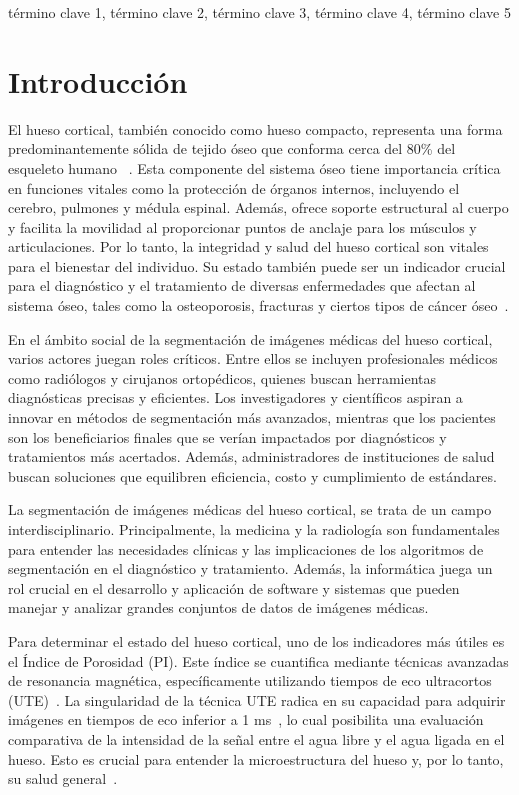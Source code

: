 \documentclass[conference]{IEEEtran}
\begin{document}
\begin{IEEEkeywords}
término clave 1, término clave 2, término clave 3, término clave 4, término clave 5
\end{IEEEkeywords}

\section{Introducción}

\noindent El hueso cortical, también conocido como hueso compacto, representa una forma predominantemente sólida de tejido óseo que conforma cerca del 80\% del esqueleto humano ~\cite{nyman2008measurements}. Esta componente del sistema óseo tiene importancia crítica en funciones vitales como la protección de órganos internos, incluyendo el cerebro, pulmones y médula espinal. Además, ofrece soporte estructural al cuerpo y facilita la movilidad al proporcionar puntos de anclaje para los músculos y articulaciones. Por lo tanto, la integridad y salud del hueso cortical son vitales para el bienestar del individuo. Su estado también puede ser un indicador crucial para el diagnóstico y el tratamiento de diversas enfermedades que afectan al sistema óseo, tales como la osteoporosis, fracturas y ciertos tipos de cáncer óseo~\cite{nyman2008measurements}.

\noindent En el ámbito social de la segmentación de imágenes médicas del hueso cortical, varios actores juegan roles críticos. Entre ellos se incluyen profesionales médicos como radiólogos y cirujanos ortopédicos, quienes buscan herramientas diagnósticas precisas y eficientes. Los investigadores y científicos aspiran a innovar en métodos de segmentación más avanzados, mientras que los pacientes son los beneficiarios finales que se verían impactados por diagnósticos y tratamientos más acertados. Además, administradores de instituciones de salud buscan soluciones que equilibren eficiencia, costo y cumplimiento de estándares.

\noindent La segmentación de imágenes médicas del hueso cortical, se trata de un campo interdisciplinario. Principalmente, la medicina y la radiología son fundamentales para entender las necesidades clínicas y las implicaciones de los algoritmos de segmentación en el diagnóstico y tratamiento. Además, la informática juega un rol crucial en el desarrollo y aplicación de software y sistemas que pueden manejar y analizar grandes conjuntos de datos de imágenes médicas.

\noindent Para determinar el estado del hueso cortical, uno de los indicadores más útiles es el Índice de Porosidad (PI). Este índice se cuantifica mediante técnicas avanzadas de resonancia magnética, específicamente utilizando tiempos de eco ultracortos (UTE)~\cite{Jerban2023}. La singularidad de la técnica UTE radica en su capacidad para adquirir imágenes en tiempos de eco inferior a 1 ms~\cite{du2012evaluacion}, lo cual posibilita una evaluación comparativa de la intensidad de la señal entre el agua libre y el agua ligada en el hueso. Esto es crucial para entender la microestructura del hueso y, por lo tanto, su salud general~\cite{Surowiec2021,Jerban2023}.
\end{document}
